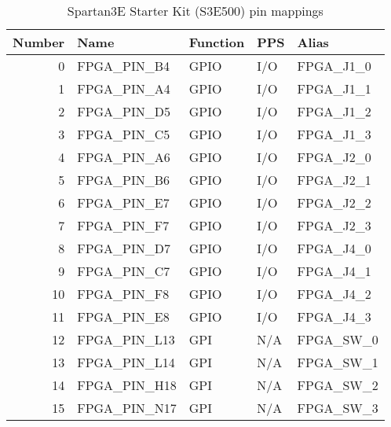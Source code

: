 \begin{table}[H]
\begin{center}
\begin{tabularx}{14cm}{rlllX}
Number & Name & Function & PPS & Alias \\
\hline
0 & FPGA\_PIN\_B4 & GPIO & I/O & FPGA\_J1\_0 \\
1 & FPGA\_PIN\_A4 & GPIO & I/O & FPGA\_J1\_1 \\
2 & FPGA\_PIN\_D5 & GPIO & I/O & FPGA\_J1\_2 \\
3 & FPGA\_PIN\_C5 & GPIO & I/O & FPGA\_J1\_3 \\
4 & FPGA\_PIN\_A6   & GPIO & I/O & FPGA\_J2\_0 \\
5 & FPGA\_PIN\_B6   & GPIO & I/O & FPGA\_J2\_1 \\
6 & FPGA\_PIN\_E7   & GPIO & I/O & FPGA\_J2\_2 \\
7 & FPGA\_PIN\_F7   & GPIO & I/O & FPGA\_J2\_3 \\
8 & FPGA\_PIN\_D7   & GPIO & I/O & FPGA\_J4\_0 \\
9 & FPGA\_PIN\_C7   & GPIO & I/O & FPGA\_J4\_1 \\
10 & FPGA\_PIN\_F8  & GPIO & I/O & FPGA\_J4\_2 \\
11 & FPGA\_PIN\_E8  & GPIO & I/O & FPGA\_J4\_3 \\
12 & FPGA\_PIN\_L13 & GPI & N/A & FPGA\_SW\_0 \\
13 & FPGA\_PIN\_L14 & GPI & N/A & FPGA\_SW\_1 \\
14 & FPGA\_PIN\_H18 & GPI & N/A & FPGA\_SW\_2 \\
15 & FPGA\_PIN\_N17 & GPI & N/A & FPGA\_SW\_3 
\end{tabularx}
\caption{Spartan3E Starter Kit (S3E500) pin mappings}
\end{center}
\end{table}

